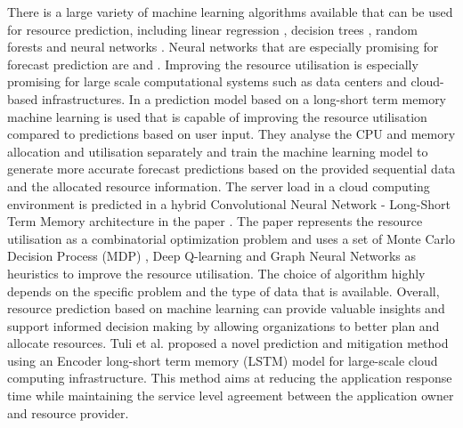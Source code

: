         There is a large variety of machine learning algorithms available that can be used for resource prediction, including linear regression \cite{weisbergAppliedLinearRegression2005}, decision trees \cite{kotsiantisDecisionTreesRecent2013}, random forests \cite{breimanRandomForests2001} and neural networks \cite{andersonIntroductionNeuralNetworks1995}.
        Neural networks that are especially promising for forecast prediction are  and .
        Improving the resource utilisation is especially promising for large scale computational systems such as data centers and cloud-based infrastructures. In \cite{thonglekImprovingResourceUtilization2019} a prediction model based on a long-short term memory machine learning is used that is capable of improving the resource utilisation compared to predictions based on user input.
        They analyse the CPU and memory allocation and utilisation separately and train the machine learning model to generate more accurate forecast predictions based on the provided sequential data and the allocated resource information.
        The server load in a cloud computing environment is predicted in a hybrid Convolutional Neural Network - Long-Short Term Memory architecture in the paper \cite{patelHybridCNNLSTMModel2022}.
        The paper \cite{orenSOLOSearchOnline2021} represents the resource utilisation as a combinatorial optimization problem and uses a set of Monte Carlo Decision Process (MDP) \cite{jamesMonteCarloTheory1980}, Deep Q-learning and Graph Neural Networks as heuristics to improve the resource utilisation.
        The choice of algorithm highly depends on the specific problem and the type of data that is available.
        Overall, resource prediction based on machine learning can provide valuable insights and support informed decision making by allowing organizations to better plan and allocate resources.
        Tuli et al. \cite{tuliStartStragglerPrediction2021} proposed a novel prediction and mitigation method using an Encoder long-short term memory (LSTM) model for large-scale cloud computing infrastructure. This method aims at reducing the application response time while maintaining the service level agreement between the application owner and resource provider.

